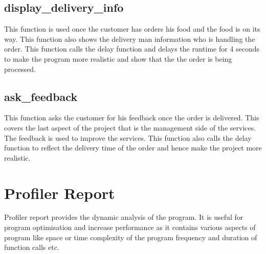 \documentclass[12pt]{article}
\begin{document}
\subsection{display\_delivery\_info}
This function is used once the customer has orders his food and the food is on its way. This function also shows the delivery man information who is handling the order. This function calls the delay function and delays the runtime for 4 seconds to make the program more realistic and show that the the order is being processed.
\subsection{ask\_feedback}
This function asks the customer for his feedback once the order is delivered. This covers the last aspect of the project that is the management side of the services. The feedback is used to improve the services. This function also calls the delay function to reflect the delivery time of the order and hence make the project more realistic.

\section{Profiler Report}
Profiler report provides the dynamic analysis of the program. It is useful for program optimisation and increase performance as it contains various aspects of program like space or time complexity of the program frequency and duration of function calls etc.\\
\end{document}
